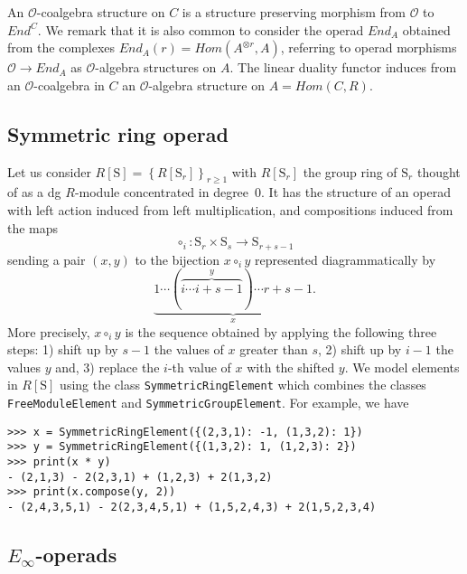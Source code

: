 \documentclass{amsart}
\renewcommand{\S}{\mathrm S}
\begin{document}
An $\mathcal O$-coalgebra structure on $C$ is a structure preserving morphism from $\mathcal O$ to $End^C$. We remark that it is also common to consider the operad $End_A$ obtained from the complexes $End_A(r) = Hom(A^{\otimes r}, A)$, referring to operad morphisms $\mathcal O \to End_A$ as $\mathcal O$-algebra structures on $A$. The linear duality functor induces from an $\mathcal O$-coalgebra in $C$ an $\mathcal O$-algebra structure on $A = Hom(C, R)$.

\subsection{Symmetric ring operad}

Let us consider $R[\S] = \left\{R[\S_r]\right\}_{r \geq 1}$ with $R[\S_r]$ the group ring of $\S_r$ thought of as a dg $R$-module concentrated in degree~$0$. It has the structure of an operad with left action induced from left multiplication, and compositions induced from the maps
\begin{equation} \label{eq: compostion of permutations}
\circ_i \colon \S_r \times \S_s \to \S_{r+s-1}
\end{equation}
sending a pair $(x, y)$ to the bijection $x \circ_i y$ represented diagrammatically by
\begin{equation*}
\underbrace{1 \cdots (\overbrace{i \cdots i+s-1}^y) \cdots r+s-1}_x.
\end{equation*}
More precisely, $x \circ_i y$ is the sequence obtained by applying the following three steps: 1) shift up by $s-1$ the values of $x$ greater than $s$, 2) shift up by $i-1$ the values $y$ and, 3) replace the $i$-th value of $x$ with the shifted $y$. We model elements in $R[\S]$ using the class \texttt{SymmetricRingElement} which combines the classes \texttt{FreeModuleElement} and \texttt{SymmetricGroupElement}. For example, we have
\begin{Verbatim}[frame=single, samepage=true]
>>> x = SymmetricRingElement({(2,3,1): -1, (1,3,2): 1})
>>> y = SymmetricRingElement({(1,3,2): 1, (1,2,3): 2})
>>> print(x * y)
- (2,1,3) - 2(2,3,1) + (1,2,3) + 2(1,3,2)
>>> print(x.compose(y, 2))
- (2,4,3,5,1) - 2(2,3,4,5,1) + (1,5,2,4,3) + 2(1,5,2,3,4)
\end{Verbatim}

\subsection{\texorpdfstring{$E_\infty$}{E-infinity}-operads}
\end{document}
